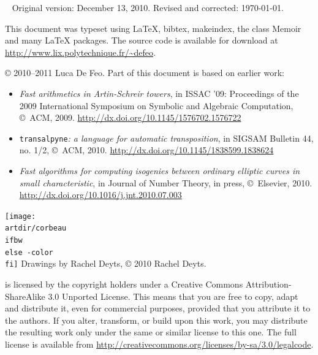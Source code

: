 \begin{titlingpage}
  \clearpage

  ~\vfill
  \footnotesize
  Original version: December 13, 2010.  Revised and corrected: \today.
  
  \bigskip

  This document was typeset using \LaTeX{}, bibtex, makeindex, the
  class Memoir and many \LaTeX{} packages. The source code is
  available for download at
  \url{http://www.lix.polytechnique.fr/~defeo}.

  \bigskip

  \copyright{} 2010--2011 Luca De Feo.  Part of this document is based
  on earlier work:
  \begin{itemize}
  \item \textit{Fast arithmetics in Artin-Schreir towers}, in ISSAC
    '09: Proceedings of the 2009 International Symposium on Symbolic
    and Algebraic Computation, \copyright{}~ACM,
    2009. \url{http://dx.doi.org/10.1145/1576702.1576722}
  \item \texttt{transalpyne}\textit{: a language for automatic
      transposition}, in SIGSAM Bulletin 44, no. 1/2,
    \copyright{}~ACM,
    2010. \url{http://dx.doi.org/10.1145/1838599.1838624}
  \item \textit{Fast algorithms for computing isogenies between
      ordinary elliptic curves in small characteristic}, in Journal of
    Number Theory, in press, \copyright{}~Elsevier,
    2010. \url{http://dx.doi.org/10.1016/j.jnt.2010.07.003}
  \end{itemize}

  \bigskip

  \ifartwork 
  \texttt{[image: \\artdir/corbeau\\ifbw\\else -color\\fi]}
  Drawings by Rachel Deyts, \copyright{} 2010 Rachel Deyts.
  \bigskip\fi

  \href{http://creativecommons.org/licenses/by-sa/3.0}{}
  \thetitle{} is licensed by the copyright holder\ifartwork s\fi{}
  under a Creative Commons Attribution-ShareAlike 3.0 Unported
  License. This means that you are free to copy, adapt and distribute
  it, even for commercial purposes, provided that you attribute it to
  the author\ifartwork s\fi.  If you alter, transform, or build upon
  this work, you may distribute the resulting work only under the same
  or similar license to this one.  The full license is available from
  \url{http://creativecommons.org/licenses/by-sa/3.0/legalcode}.
\end{titlingpage}

